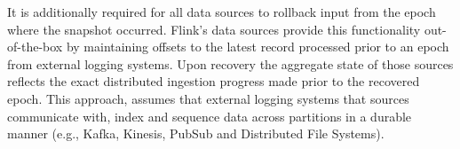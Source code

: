 
It is additionally required for all data sources to rollback input from the epoch where the snapshot occurred. Flink's data sources provide this functionality out-of-the-box by maintaining offsets to the latest record processed prior to an epoch from external logging systems. Upon recovery the aggregate state of those sources reflects the exact distributed ingestion progress made prior to the recovered epoch. This approach, assumes that external logging systems that sources communicate with, index and sequence data across partitions in a durable manner (e.g., Kafka, Kinesis, PubSub and Distributed File Systems). 





